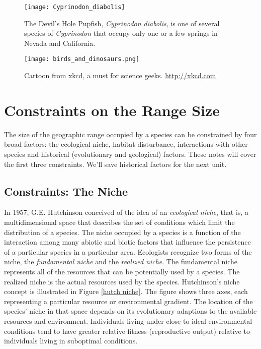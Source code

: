 \documentclass[11pt, hidelinks]{article}
\begin{document}
\begin{figure}[htb]
	\centering
		\texttt{[image: Cyprinodon\_diabolis]}  
		\caption{The Devil's Hole Pupfish, \emph{Cyprinodon diabolis}, is one of several species of \emph{Cyprinodon} that occupy only one or a few springs in Nevada and California.\label{cdiabolis}}
		
\end{figure}


\begin{figure}
	\centering
	\texttt{[image: birds\_and\_dinosaurs.png]}
	\caption{Cartoon from xkcd, a must for science geeks.\label{xkcd} \url{http://xkcd.com}}
\end{figure}

\section{Constraints on the Range Size}

The size of the geographic range occupied by a species can be constrained by four broad factors: the ecological niche, habitat disturbance, interactions with other species and historical (evolutionary and geological) factors.  These notes will cover the first three constraints. We'll save historical factors for the next unit.


\subsection{Constraints: The Niche}

In 1957, G.E. Hutchinson conceived of the idea of an \emph{ecological niche}, that is, a multidimensional space that describes the set of conditions which limit the distribution of a species.  The niche occupied by a species is a function of the interaction among many abiotic and biotic factors that influence the persistence of a particular species in a particular area.  Ecologists recognize two forms of the niche, the \emph{fundamental niche} and the \emph{realized niche}. The fundamental niche represents all of the resources that can be potentially used by a species.  The realized niche is the actual resources used by the species. Hutchinson's niche concept is illustrated in Figure \ref{hutch niche}.  The figure shows three axes, each representing a particular resource or environmental gradient.  The location of the species' niche in that space depends on its evolutionary adaptions to the available resources and environment.  Individuals living under close to ideal environmental conditions tend to have greater relative fitness (reproductive output) relative to individuals living in suboptimal conditions.
\end{document}
